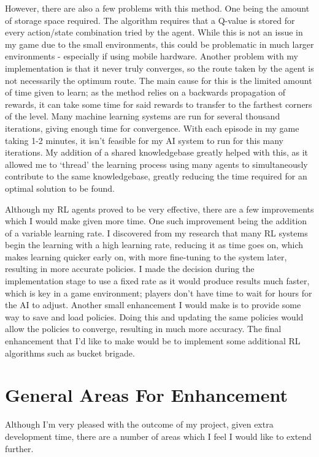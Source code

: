 \documentclass[a4paper,oneside]{report}
\begin{document}
However, there are also a few problems with this method. One being the amount of storage space required. The algorithm requires that a Q-value is stored for every action/state combination tried by the agent. While this is not an issue in my game due to the small environments, this could be problematic in much larger environments - especially if using mobile hardware. Another problem with my implementation is that it never truly converges, so the route taken by the agent is not necessarily the optimum route. The main cause for this is the limited amount of time given to learn; as the method relies on a backwards propagation of rewards, it can take some time for said rewards to transfer to the farthest corners of the level. Many machine learning systems are run for several thousand iterations, giving enough time for convergence. With each episode in my game taking 1-2 minutes, it isn't feasible for my AI system to run for this many iterations. My addition of a shared knowledgebase greatly helped with this, as it allowed me to `thread' the learning process using many agents to simultaneously contribute to the same knowledgebase, greatly reducing the time required for an optimal solution to be found. 

Although my RL agents proved to be very effective, there are a few improvements which I would make given more time. One such improvement being the addition of a variable learning rate. I discovered from my research that many RL systems begin the learning with a high learning rate, reducing it as time goes on, which makes learning quicker early on, with more fine-tuning to the system later, resulting in more accurate policies. I made the decision during the implementation stage to use a fixed rate as it would produce results much faster, which is key in a game environment; players don't have time to wait for hours for the AI to adjust. Another small enhancement I would make is to provide some way to save and load policies. Doing this and updating the same policies would allow the policies to converge, resulting in much more accuracy. The final enhancement that I'd like to make would be to implement some additional RL algorithms such as bucket brigade.

\section{General Areas For Enhancement}

Although I'm very pleased with the outcome of my project, given extra development time, there are a number of areas which I feel I would like to extend further.
\end{document}
